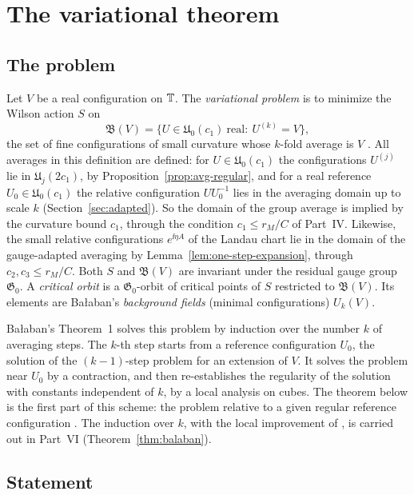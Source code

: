 \section{The variational theorem}\label{sec:var-theorem}

\subsection{The problem}\label{ss:25.1}

Let $V$ be a real configuration on $\mathbb T$. The \emph{variational problem} is to minimize the Wilson action $S$ on
\[
\mathfrak B(V)=\{U\in\mathfrak U_0(c_1)\ \text{real}:\ U^{(k)}=V\},
\]
the set of fine configurations of small curvature whose $k$-fold average is $V$ \cite[(3), (5), (6)]{BalVar}. All averages in this definition are defined: for $U\in\mathfrak U_0(c_1)$ the configurations $U^{(j)}$ lie in $\mathfrak U_j(2c_1)$, by Proposition~\ref{prop:avg-regular}, and for a real reference $U_0\in\mathfrak U_0(c_1)$ the relative configuration $UU_0^{-1}$ lies in the averaging domain up to scale $k$ (Section~\ref{sec:adapted}). So the domain of the group average is implied by the curvature bound $c_1$, through the condition $c_1\le r_M/C$ of Part~IV. Likewise, the small relative configurations $e^{\ii\eta A}$ of the Landau chart lie in the domain of the gauge-adapted averaging by Lemma~\ref{lem:one-step-expansion}, through $c_2,c_3\le r_M/C$. Both $S$ and $\mathfrak B(V)$ are invariant under the residual gauge group $\mathfrak G_0$. A \emph{critical orbit} is a $\mathfrak G_0$-orbit of critical points of $S$ restricted to $\mathfrak B(V)$. Its elements are Ba\l aban's \emph{background fields} (minimal configurations) $U_k(V)$.

Ba\l aban's Theorem~1 \cite{BalVar} solves this problem by induction over the number $k$ of averaging steps. The $k$-th step starts from a reference configuration $U_0$, the solution of the $(k-1)$-step problem for an extension of $V$. It solves the problem near $U_0$ by a contraction, and then re-establishes the regularity of the solution with constants independent of $k$, by a local analysis on cubes. The theorem below is the first part of this scheme: the problem relative to a given regular reference configuration \cite[Sects.~A--E, G]{BalVar}. The induction over $k$, with the local improvement of \cite[Sect.~F]{BalVar}, is carried out in Part~VI (Theorem~\ref{thm:balaban}).

\subsection{Statement}\label{ss:25.2}

